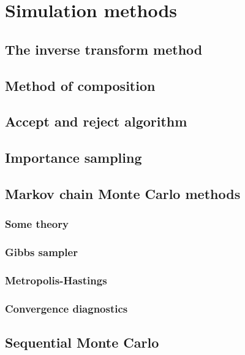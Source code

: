 \chapter{Simulation methods}\label{chap5}

\section{The inverse transform method}\label{sec51}

\section{Method of composition}\label{sec52}

\section{Accept and reject algorithm}\label{sec53}

\section{Importance sampling}\label{sec54}

\section{Markov chain Monte Carlo methods}\label{sec55}

\subsection{Some theory}\label{sec551}

\subsection{Gibbs sampler}\label{sec552}

\subsection{Metropolis-Hastings}\label{sec553}

\subsection{Convergence diagnostics}\label{sec554}

\section{Sequential Monte Carlo}\label{sec56}
